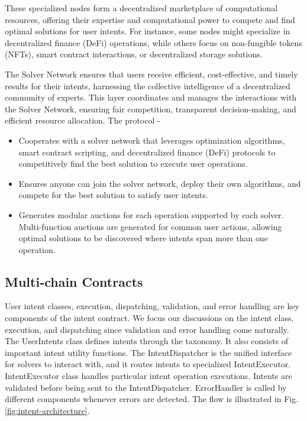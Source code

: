 \documentclass[11pt,letterpaper,twocolumn]{article}
\begin{document}
These specialized nodes form a decentralized marketplace of computational resources, offering their expertise and computational power to compete and find optimal solutions for user intents. For instance, some nodes might specialize in decentralized finance (DeFi) operations, while others focus on non-fungible tokens (NFTs), smart contract interactions, or decentralized storage solutions.

The Solver Network ensures that users receive efficient, cost-effective, and timely results for their intents, harnessing the collective intelligence of a decentralized community of experts. This layer coordinates and manages the interactions with the Solver Network, ensuring fair competition, transparent decision-making, and efficient resource allocation. The protocol -

\begin{itemize}
    \item Cooperates with a solver network that leverages optimization algorithms, smart contract scripting, and decentralized finance (DeFi) protocols to competitively find the best solution to execute user operations.

    \item Ensures anyone can join the solver network, deploy their own algorithms, and compete for the best solution to satisfy user intents.
    \item Generates modular auctions for each operation supported by each solver. Multi-function auctions are generated for common user actions, allowing optimal solutions to be discovered where intents span more than one operation.
\end{itemize}


\subsection{Multi-chain Contracts}
\label{sec:intent-peripherals}
User intent classes, execution, dispatching, validation, and error handling are key components of the intent contract. We focus our discussions on the intent class, execution, and dispatching since validation and error handling come naturally. The UserIntents class defines intents through the taxonomy. It also consists of important intent utility functions. The IntentDispatcher is the unified interface for solvers to interact with, and it routes intents to specialized IntentExecutor. IntentExecutor class handles particular intent operation executions. Intents are validated before being sent to the IntentDispatcher. ErrorHandler is called by different components whenever errors are detected. The flow is illustrated in
Fig. \ref{fig:intent-architecture}.
\end{document}
